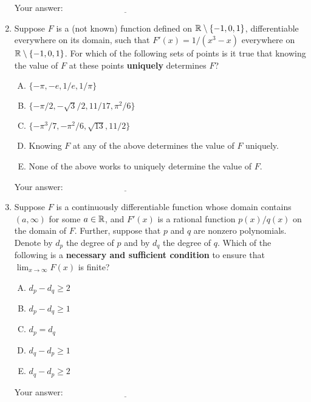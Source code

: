 \documentclass[10pt]{amsart}
\begin{document}
\begin{enumerate}
  \vspace{0.05in}
  Your answer: $\underline{\qquad\qquad\qquad\qquad\qquad\qquad\qquad}$
  \vspace{0.05in}

\item Suppose $F$ is a (not known) function defined on $\mathbb{R} \setminus
  \{ -1,0,1\}$, differentiable everywhere on its domain, such that
  $F'(x) = 1/(x^3 - x)$ everywhere on $\mathbb{R} \setminus \{-1,0,1\}$. For
  which of the following sets of points is it true that knowing the
  value of $F$ at these points {\bf uniquely} determines $F$?

  \begin{enumerate}[(A)]
  \item $\{ -\pi, -e, 1/e,1/\pi \}$
  \item $\{ -\pi/2, -\sqrt{3}/2, 11/17,\pi^2/6 \}$
  \item $\{ -\pi^3/7,-\pi^2/6,\sqrt{13},11/2 \}$
  \item Knowing $F$ at any of the above determines the value of $F$
    uniquely.
  \item None of the above works to uniquely determine the value of
    $F$.
  \end{enumerate}

  \vspace{0.05in}
  Your answer: $\underline{\qquad\qquad\qquad\qquad\qquad\qquad\qquad}$
  \vspace{0.05in}

\item Suppose $F$ is a continuously differentiable function whose
  domain contains $(a,\infty)$ for some $a \in \mathbb{R}$, and $F'(x)$ is a
  rational function $p(x)/q(x)$ on the domain of $F$. Further, suppose
  that $p$ and $q$ are nonzero polynomials. Denote by $d_p$ the degree
  of $p$ and by $d_q$ the degree of $q$. Which of the following is a
  {\bf necessary and sufficient condition} to ensure that $\lim_{x \to
  \infty} F(x)$ is finite?

  \begin{enumerate}[(A)]
  \item $d_p - d_q \ge 2$
  \item $d_p - d_q \ge 1$
  \item $d_p = d_q$
  \item $d_q - d_p \ge 1$
  \item $d_q - d_p \ge 2$
  \end{enumerate}

  \vspace{0.05in}
  Your answer: $\underline{\qquad\qquad\qquad\qquad\qquad\qquad\qquad}$
  \vspace{0.05in}


\end{enumerate}
\end{document}

